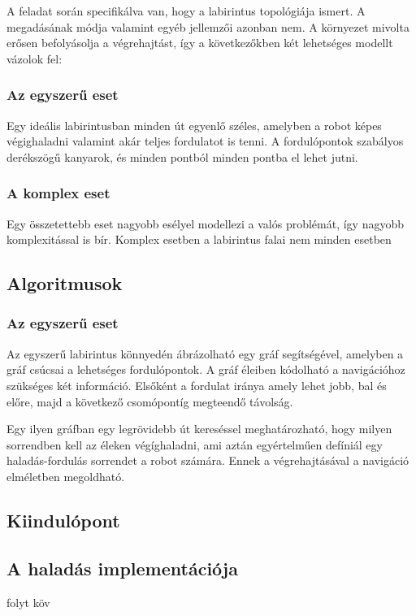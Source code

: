 A feladat során specifikálva van, hogy a labirintus topológiája ismert. A
megadásának módja valamint egyéb jellemzői azonban nem. A környezet mivolta
erősen befolyásolja a végrehajtást, így a következőkben két lehetséges modellt
vázolok fel:

\subsubsection{Az egyszerű eset}

Egy ideális labirintusban minden út egyenlő széles, amelyben a robot képes
végighaladni valamint akár teljes fordulatot is tenni. A fordulópontok szabályos
derékszögű kanyarok, és minden pontból minden pontba el lehet jutni.

\subsubsection{A komplex eset}

Egy összetettebb eset nagyobb esélyel modellezi a valós problémát, így nagyobb
komplexitással is bír. Komplex esetben a labirintus falai nem minden esetben 


\subsection{Algoritmusok}
\subsubsection{Az egyszerű eset}

\medskip

Az egyszerű labirintus könnyedén ábrázolható egy gráf segítségével, amelyben a
gráf csúcsai a lehetséges fordulópontok. A gráf éleiben kódolható a navigációhoz
szükséges két információ. Elsőként a fordulat iránya amely lehet  jobb, bal és
előre, majd a következő csomópontíg megteendő távolság.

Egy ilyen gráfban egy legrövidebb út kereséssel meghatározható, hogy milyen
sorrendben kell az éleken végíghaladni, ami aztán egyértelműen defíniál egy
haladás-fordulás sorrendet a robot számára. Ennek a végrehajtásával a navigáció 
elméletben megoldható.

\subsection{Kiindulópont}

\subsection{A haladás implementációja}

folyt köv
